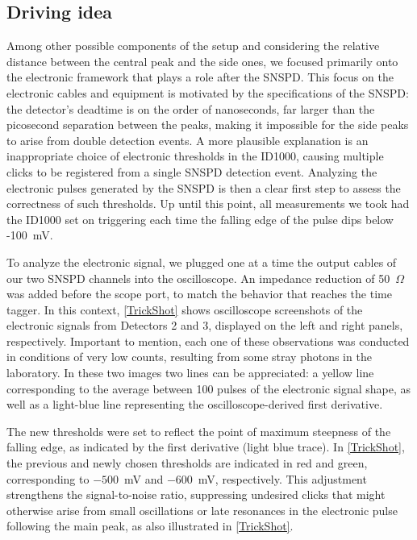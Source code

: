 \subsection{Driving idea}
Among other possible components of the setup and considering the relative distance between the central peak and the side ones, we focused primarily onto the electronic framework that plays a role after the SNSPD.
This focus on the electronic cables and equipment is motivated by the specifications of the SNSPD: the detector’s deadtime is on the order of nanoseconds, far larger than the picosecond separation between the peaks, making it impossible for the side peaks to arise from double detection events.
A more plausible explanation is an inappropriate choice of electronic thresholds in the ID1000, causing multiple clicks to be registered from a single SNSPD detection event.
Analyzing the electronic pulses generated by the SNSPD is then a clear first step to assess the correctness of such thresholds.
Up until this point, all measurements we took had the ID1000 set on triggering each time the falling edge of the pulse dips below -100~mV.

To analyze the electronic signal, we plugged one at a time the output cables of our two SNSPD channels into the oscilloscope. An impedance reduction of 50~$\Omega$ was added before the scope port, to match the behavior that reaches the time tagger.
In this context, \autoref{TrickShot} shows oscilloscope screenshots of the electronic signals from Detectors 2 and 3, displayed on the left and right panels, respectively.
Important to mention, each one of these observations was conducted in conditions of very low counts, resulting from some stray photons in the laboratory.
In these two images two lines can be appreciated: a yellow line corresponding to the average between 100 pulses of the electronic signal shape, as well as a light-blue line representing the oscilloscope-derived first derivative.

The new thresholds were set to reflect the point of maximum steepness of the falling edge, as indicated by the first derivative (light blue trace).
In \autoref{TrickShot}, the previous and newly chosen thresholds are indicated in red and green, corresponding to \(-500\)~mV and \(-600\)~mV, respectively.
This adjustment strengthens the signal-to-noise ratio, suppressing undesired clicks that might otherwise arise from small oscillations or late resonances in the electronic pulse following the main peak, as also illustrated in \autoref{TrickShot}.




